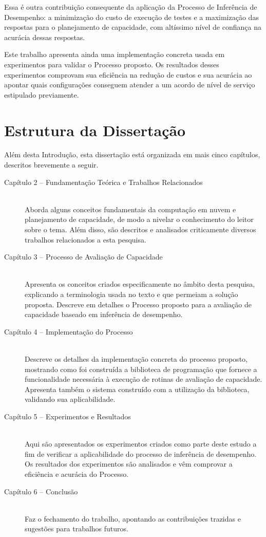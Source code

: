 Essa é outra contribuição consequente da aplicação da Processo de Inferência de
Desempenho: a minimização do custo de execução de testes e a maximização das 
respostas para o planejamento de capacidade, com altíssimo nível de confiança na
acurácia dessas respostas.

Este trabalho apresenta ainda uma implementação concreta usada em experimentos para 
validar o Processo proposto. Os resultados desses experimentos comprovam sua eficiência 
na redução de custos e sua acurácia ao apontar quais configurações conseguem 
atender a um acordo de nível de serviço estipulado previamente. 

\section{Estrutura da Dissertação}
Além desta Introdução, esta dissertação está organizada em mais cinco capítulos, 
descritos brevemente a seguir.

\begin{description}
  \item[Capítulo 2 -- Fundamentação Teórica e Trabalhos Relacionados] \hfill \\
  Aborda alguns conceitos fundamentais da computação em nuvem e planejamento de
  capacidade, de modo a nivelar o conhecimento do leitor sobre o tema. Além disso, 
  são descritos e analisados criticamente diversos trabalhos relacionados a esta pesquisa.
  \item[Capítulo 3 -- Processo de Avaliação de Capacidade] \hfill \\
  Apresenta os conceitos criados especificamente no âmbito desta pesquisa, explicando 
  a terminologia usada no texto e que permeiam a solução proposta. Descreve em 
  detalhes o Processo proposto para a avaliação de capacidade baseado em
  inferência de desempenho.
  \item[Capítulo 4 -- Implementação do Processo] \hfill \\
  Descreve os detalhes da implementação concreta do processo proposto, mostrando
  como foi construída a biblioteca de programação que fornece a funcionalidade
  necessária à execução de rotinas de avaliação de capacidade. Apresenta também
  o sistema construído com a utilização da biblioteca, validando sua 
  aplicabilidade. 
  \item[Capítulo 5 -- Experimentos e Resultados] \hfill \\
  Aqui são apresentados os experimentos criados como parte deste estudo a fim de
  verificar a aplicabilidade do processo de inferência de desempenho. Os resultados 
  dos experimentos são analisados e vêm comprovar a eficiência e acurácia do 
  Processo. 
  \item[Capítulo 6 -- Conclusão] \hfill \\
  Faz o fechamento do trabalho, apontando as contribuições trazidas e sugestões
  para trabalhos futuros. 
\end{description}
